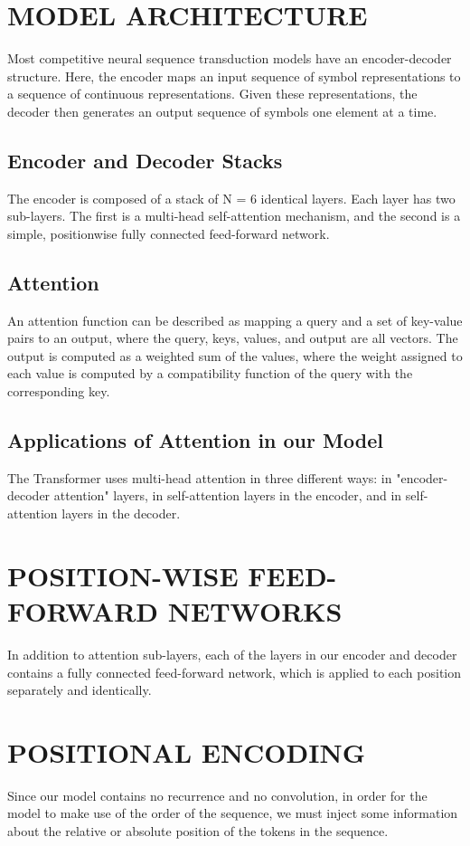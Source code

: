 \documentclass[conference]{IEEEtran}
\begin{document}
\section{MODEL ARCHITECTURE}
Most competitive neural sequence transduction models have an encoder-decoder structure. Here, the encoder maps an input sequence of symbol representations to a sequence of continuous representations. Given these representations, the decoder then generates an output sequence of symbols one element at a time.

\subsection{Encoder and Decoder Stacks}
The encoder is composed of a stack of N = 6 identical layers. Each layer has two sub-layers. The first is a multi-head self-attention mechanism, and the second is a simple, positionwise fully connected feed-forward network.

\subsection{Attention}
An attention function can be described as mapping a query and a set of key-value pairs to an output, where the query, keys, values, and output are all vectors. The output is computed as a weighted sum of the values, where the weight assigned to each value is computed by a compatibility function of the query with the corresponding key.

\subsection{Applications of Attention in our Model}
The Transformer uses multi-head attention in three different ways: in "encoder-decoder attention" layers, in self-attention layers in the encoder, and in self-attention layers in the decoder.

\section{POSITION-WISE FEED-FORWARD NETWORKS}
In addition to attention sub-layers, each of the layers in our encoder and decoder contains a fully connected feed-forward network, which is applied to each position separately and identically.

\section{POSITIONAL ENCODING}
Since our model contains no recurrence and no convolution, in order for the model to make use of the order of the sequence, we must inject some information about the relative or absolute position of the tokens in the sequence.
\end{document}
